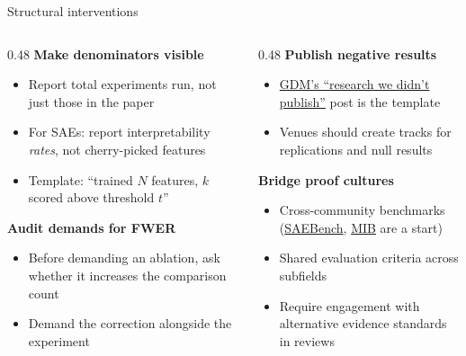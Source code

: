 \documentclass[aspectratio=169,11pt]{beamer}
\begin{document}
\begin{frame}[label=interventions]{Structural interventions}
\begin{columns}[T]
\begin{column}{0.48\textwidth}
\textbf{Make denominators visible}
\begin{itemize}\setlength\itemsep{1pt}
  \item {\small Report total experiments run, not just those in the paper}
  \item {\small For SAEs: report interpretability \emph{rates}, not cherry-picked features}
  \item {\small Template: ``trained $N$ features, $k$ scored above threshold $t$''}
\end{itemize}

\vspace{0.2em}
\textbf{Audit demands for FWER}
\begin{itemize}\setlength\itemsep{1pt}
  \item {\small Before demanding an ablation, ask whether it increases the comparison count}
  \item {\small Demand the correction alongside the experiment}
\end{itemize}
\end{column}
\begin{column}{0.48\textwidth}
\textbf{Publish negative results}
\begin{itemize}\setlength\itemsep{1pt}
  \item {\small \href{https://www.alignmentforum.org/posts/HpAr8k74mW4ivCvCu/summary-progress-update-1-from-the-gdm-mech-interp-team}{GDM's ``research we didn't publish''} post is the template}
  \item {\small Venues should create tracks for replications and null results}
\end{itemize}

\vspace{0.2em}
\textbf{Bridge proof cultures}
\begin{itemize}\setlength\itemsep{1pt}
  \item {\small Cross-community benchmarks (\href{https://github.com/adamkarvonen/SAEBench}{SAEBench}, \href{https://arxiv.org/abs/2410.15748}{MIB} are a start)}
  \item {\small Shared evaluation criteria across subfields}
  \item {\small Require engagement with alternative evidence standards in reviews}
\end{itemize}
\end{column}
\end{columns}
\end{frame}
\end{document}
